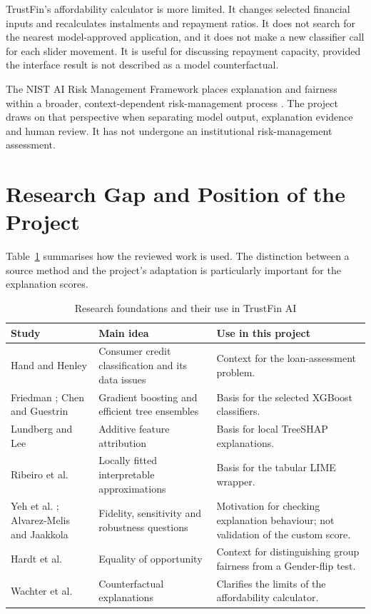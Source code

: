 TrustFin's affordability calculator is more limited. It changes selected financial inputs and recalculates instalments and repayment ratios. It does not search for the nearest model-approved application, and it does not make a new classifier call for each slider movement. It is useful for discussing repayment capacity, provided the interface result is not described as a model counterfactual.

The NIST AI Risk Management Framework places explanation and fairness within a broader, context-dependent risk-management process \cite{nistAirmf2023}. The project draws on that perspective when separating model output, explanation evidence and human review. It has not undergone an institutional risk-management assessment.

\section{Research Gap and Position of the Project}
Table~\ref{tab:literature-comparison} summarises how the reviewed work is used. The distinction between a source method and the project's adaptation is particularly important for the explanation scores.

\begin{table}[htbp]
\centering\small
\caption{Research foundations and their use in TrustFin AI}\label{tab:literature-comparison}
\begin{tabularx}{\textwidth}{p{3.3cm}XX}
\toprule
Study & Main idea & Use in this project\\\midrule
Hand and Henley \cite{handHenley1997} & Consumer credit classification and its data issues & Context for the loan-assessment problem.\\
Friedman \cite{friedman2001}; Chen and Guestrin \cite{chen2016} & Gradient boosting and efficient tree ensembles & Basis for the selected XGBoost classifiers.\\
Lundberg and Lee \cite{lundberg2017} & Additive feature attribution & Basis for local TreeSHAP explanations.\\
Ribeiro et al. \cite{ribeiro2016} & Locally fitted interpretable approximations & Basis for the tabular LIME wrapper.\\
Yeh et al. \cite{yeh2019}; Alvarez-Melis and Jaakkola \cite{alvarezm2018} & Fidelity, sensitivity and robustness questions & Motivation for checking explanation behaviour; not validation of the custom score.\\
Hardt et al. \cite{hardt2016} & Equality of opportunity & Context for distinguishing group fairness from a Gender-flip test.\\
Wachter et al. \cite{wachter2018} & Counterfactual explanations & Clarifies the limits of the affordability calculator.\\\bottomrule
\end{tabularx}
\end{table}

